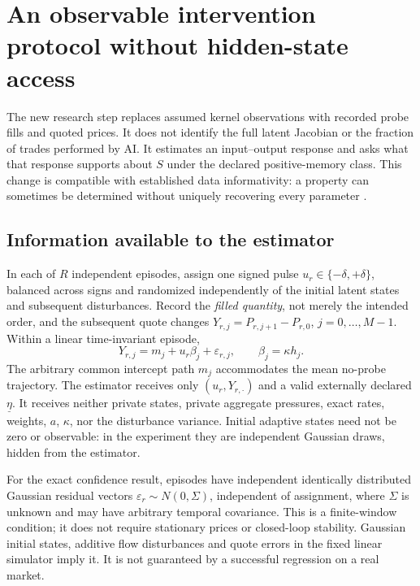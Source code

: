 \documentclass[11pt,a4paper]{article}
\theoremstyle{definition}
\theoremstyle{remark}
\begin{document}
\section{An observable intervention protocol without hidden-state access}
\label{sec:observable_protocol}
The new research step replaces assumed kernel observations with recorded probe fills and quoted prices. It does not identify the full latent Jacobian or the fraction of trades performed by AI. It estimates an input--output response and asks what that response supports about $S$ under the declared positive-memory class. This change is compatible with established data informativity: a property can sometimes be determined without uniquely recovering every parameter \citep{vanwaarde2020}.

\subsection{Information available to the estimator}
In each of $R$ independent episodes, assign one signed pulse $u_r\in\{-\delta,+\delta\}$, balanced across signs and randomized independently of the initial latent states and subsequent disturbances. Record the \emph{filled quantity}, not merely the intended order, and the subsequent quote changes $Y_{r,j}=P_{r,j+1}-P_{r,0}$, $j=0,\ldots,M-1$. Within a linear time-invariant episode,
\begin{equation}
 Y_{r,j}=m_j+u_r\beta_j+\varepsilon_{r,j},
 \qquad \beta_j=\kappa h_j.
 \label{eq:public_measurement}
\end{equation}
The arbitrary common intercept path $m_j$ accommodates the mean no-probe trajectory. The estimator receives only $(u_r,Y_{r,\cdot})$ and a valid externally declared $\underline\eta$. It receives neither private states, private aggregate pressures, exact rates, weights, $a$, $\kappa$, nor the disturbance variance. Initial adaptive states need not be zero or observable: in the experiment they are independent Gaussian draws, hidden from the estimator.

For the exact confidence result, episodes have independent identically distributed Gaussian residual vectors $\varepsilon_r\sim N(0,\Sigma)$, independent of assignment, where $\Sigma$ is unknown and may have arbitrary temporal covariance. This is a finite-window condition; it does not require stationary prices or closed-loop stability. Gaussian initial states, additive flow disturbances and quote errors in the fixed linear simulator imply it. It is not guaranteed by a successful regression on a real market.
\end{document}
